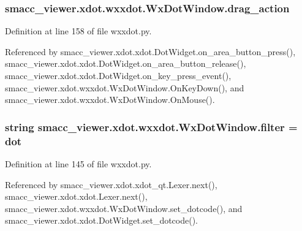 \subsubsection[{\texorpdfstring{drag\+\_\+action}{drag_action}}]{\setlength{\rightskip}{0pt plus 5cm}smacc\+\_\+viewer.\+xdot.\+wxxdot.\+Wx\+Dot\+Window.\+drag\+\_\+action}\hypertarget{classsmacc__viewer_1_1xdot_1_1wxxdot_1_1WxDotWindow_abc485b8edac4df3626a3c3a811a5d369}{}\label{classsmacc__viewer_1_1xdot_1_1wxxdot_1_1WxDotWindow_abc485b8edac4df3626a3c3a811a5d369}


Definition at line 158 of file wxxdot.\+py.



Referenced by smacc\+\_\+viewer.\+xdot.\+xdot.\+Dot\+Widget.\+on\+\_\+area\+\_\+button\+\_\+press(), smacc\+\_\+viewer.\+xdot.\+xdot.\+Dot\+Widget.\+on\+\_\+area\+\_\+button\+\_\+release(), smacc\+\_\+viewer.\+xdot.\+xdot.\+Dot\+Widget.\+on\+\_\+key\+\_\+press\+\_\+event(), smacc\+\_\+viewer.\+xdot.\+wxxdot.\+Wx\+Dot\+Window.\+On\+Key\+Down(), and smacc\+\_\+viewer.\+xdot.\+wxxdot.\+Wx\+Dot\+Window.\+On\+Mouse().

\subsubsection[{\texorpdfstring{filter}{filter}}]{\setlength{\rightskip}{0pt plus 5cm}string smacc\+\_\+viewer.\+xdot.\+wxxdot.\+Wx\+Dot\+Window.\+filter = \textquotesingle{}dot\textquotesingle{}\hspace{0.3cm}{\ttfamily [static]}}\hypertarget{classsmacc__viewer_1_1xdot_1_1wxxdot_1_1WxDotWindow_a28b94154e31dbeab4f0d97a23b29bc39}{}\label{classsmacc__viewer_1_1xdot_1_1wxxdot_1_1WxDotWindow_a28b94154e31dbeab4f0d97a23b29bc39}


Definition at line 145 of file wxxdot.\+py.



Referenced by smacc\+\_\+viewer.\+xdot.\+xdot\+\_\+qt.\+Lexer.\+next(), smacc\+\_\+viewer.\+xdot.\+xdot.\+Lexer.\+next(), smacc\+\_\+viewer.\+xdot.\+wxxdot.\+Wx\+Dot\+Window.\+set\+\_\+dotcode(), and smacc\+\_\+viewer.\+xdot.\+xdot.\+Dot\+Widget.\+set\+\_\+dotcode().

